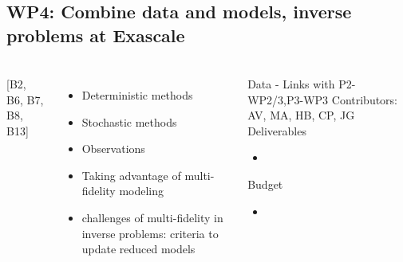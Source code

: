 \subsection{WP4: Combine data and models, inverse problems at Exascale }
\begin{frame}
  \frametitle{\insertsectionhead}
  \framesubtitle{\insertsubsectionhead}
  \begin{columns}
    [B2, B6, B7, B8, B13]
    \begin{itemize}
      \item Deterministic methods
      \item Stochastic methods
      \item Observations
      \item Taking advantage of multi-fidelity modeling
      \item challenges of multi-fidelity in inverse problems: criteria to update reduced models
    \end{itemize}
    \begin{alertblock}{Data - Links with P2-WP2/3,P3-WP3}
    Contributors: AV, MA, HB, CP, JG
    Deliverables
      \begin{itemize}
        \item 
      \end{itemize}
      Budget
      \begin{itemize}
        \item 
      \end{itemize}
    \end{alertblock}
  \end{columns}
\end{frame}

